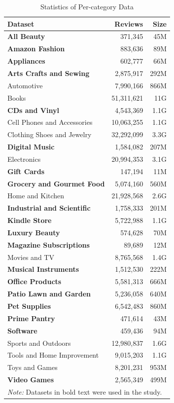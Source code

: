 \documentclass[sigconf,authorversion,nonacm]{acmart}
\begin{document}
    \begin{table}
        \caption{Statistics of Per-category Data}
        \label{tab:stat}
        \begin{tabular}{lrr}
        \toprule
        \textbf{Dataset} & \textbf{Reviews} & \textbf{Size} \\
        \midrule
        \textbf{All Beauty} & 371,345 & 45M \\
        \textbf{Amazon Fashion} & 883,636 & 89M \\
        \textbf{Appliances} & 602,777 & 66M \\
        \textbf{Arts Crafts and Sewing} & 2,875,917 & 292M \\
        Automotive & 7,990,166 & 866M \\
        Books & 51,311,621 &  11G\\
        \textbf{CDs and Vinyl} & 4,543,369 & 1.1G \\
        Cell Phones and Accessories & 10,063,255 & 1.1G  \\
        Clothing Shoes and Jewelry & 32,292,099 &  3.3G \\
        \textbf{Digital Music} & 1,584,082 & 207M \\
        Electronics & 20,994,353 & 3.1G \\
        \textbf{Gift Cards} & 147,194 & 11M \\
        \textbf{Grocery and Gourmet Food} & 5,074,160 & 560M \\
        Home and Kitchen & 21,928,568 & 2.6G  \\
        \textbf{Industrial and Scientific} & 1,758,333 & 201M \\
        \textbf{Kindle Store} & 5,722,988 & 1.1G \\
        \textbf{Luxury Beauty} & 574,628 & 70M \\
        \textbf{Magazine Subscriptions} & 89,689 & 12M \\
        Movies and TV & 8,765,568 & 1.4G \\
        \textbf{Musical Instruments} & 1,512,530 & 222M \\
        \textbf{Office Products} & 5,581,313 & 666M \\
        \textbf{Patio Lawn and Garden} & 5,236,058 & 640M \\
        \textbf{Pet Supplies} & 6,542,483 & 860M \\
        \textbf{Prime Pantry} & 471,614 & 43M \\
        \textbf{Software} & 459,436 & 94M \\
        Sports and Outdoors & 12,980,837 & 1.6G \\
        Tools and Home Improvement & 9,015,203 & 1.1G \\
        Toys and Games & 8,201,231 & 953M \\
        \textbf{Video Games} & 2,565,349 & 499M \\ \midrule
         \multicolumn{3}{l}{\textit{Note:} Datasets in bold text were used in the study.} \\ \bottomrule
        \end{tabular}
    \end{table}
\end{document}
